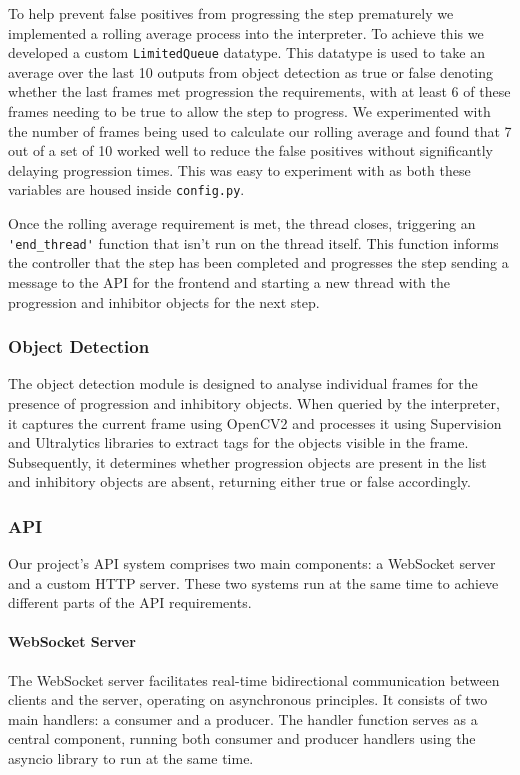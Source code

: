 \documentclass{article}
\begin{document}
    To help prevent false positives from progressing the step prematurely we implemented a rolling average process into the interpreter. To achieve this we developed a custom \verb|LimitedQueue| datatype. This datatype is used to take an average over the last 10 outputs from object detection as true or false denoting whether the last frames met progression the requirements, with at least 6 of these frames needing to be true to allow the step to progress. We experimented with the number of frames being used to calculate our rolling average and found that 7 out of a set of 10 worked well to reduce the false positives without significantly delaying progression times. This was easy to experiment with as both these variables are housed inside \verb|config.py|.
    
    Once the rolling average requirement is met, the thread closes, triggering an \verb|'end_thread'| function that isn’t run on the thread itself. This function informs the controller that the step has been completed and progresses the step sending a message to the API for the frontend and starting a new thread with the progression and inhibitor objects for the next step.

    \subsubsection{Object Detection}
    The object detection module is designed to analyse individual frames for the presence of progression and inhibitory objects. When queried by the interpreter, it captures the current frame using OpenCV2 and processes it using Supervision and  Ultralytics libraries to extract tags for the objects visible in the frame. Subsequently, it determines whether progression objects are present in the list and inhibitory objects are absent, returning either true or false accordingly.
    \subsubsection{API}
    Our project's API system comprises two main components: a WebSocket server and a custom HTTP server. These two systems run at the same time to achieve different parts of the API requirements.
    
    \paragraph{WebSocket Server}
    The WebSocket server facilitates real-time bidirectional communication between clients and the server, operating on asynchronous principles. It consists of two main handlers: a consumer and a producer. The handler function serves as a central component, running both consumer and producer handlers using the asyncio library to run at the same time.
    
\end{document}

